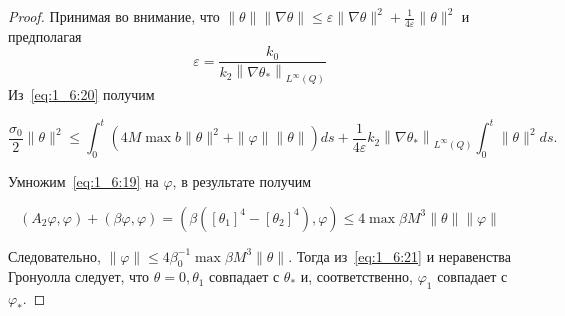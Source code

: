 \begin{proof}
    Принимая во внимание,
    что $\|\theta\|\|\nabla \theta\| \leq \varepsilon\|\nabla \theta\|^{2}
    +\frac{1}{4 \varepsilon}\|\theta\|^{2}$ и предполагая
    \[
        \varepsilon=\frac{k_{0}}{k_{2}\left\|\nabla \theta_{*}\right\|_{L^{\infty}(Q)}}
    \]
    Из~\eqref{eq:1_6:20} получим

    \begin{equation}
        \label{eq:1_6:21}
        \frac{\sigma_{0}}{2}\|\theta\|^{2} \leq \int_{0}^{t}\left(4 M \max b\|\theta\|^{2}
        +\|\varphi\|\|\theta\|\right) d s
        +\frac{1}{4 \varepsilon} k_{2}\left\|\nabla
        \theta_{*}\right\|_{L^{\infty}(Q)} \int_{0}^{t}\|\theta\|^{2} d s.
    \end{equation}

    Умножим~\eqref{eq:1_6:19} на $\varphi$, в результате получим

    \[
        \left(A_{2} \varphi, \varphi\right)+(\beta \varphi, \varphi)
        =\left(\beta\left(\left[\theta_{1}\right]^{4}
        -\left[\theta_{2}\right]^{4}\right), \varphi\right)
        \leq 4 \max \beta M^{3}\|\theta\|\|\varphi\|
    \]


    Следовательно, $\|\varphi\| \leq 4 \beta_{0}^{-1} \max \beta M^{3}\|\theta\|$.
    Тогда из~\eqref{eq:1_6:21} и неравенства Гронуолла следует,
    что $\theta=0, \theta_{1}$ совпадает с $\theta_{*}$ и,
    соответственно, $\varphi_{1}$ совпадает с $\varphi_{*}$.
\end{proof}

